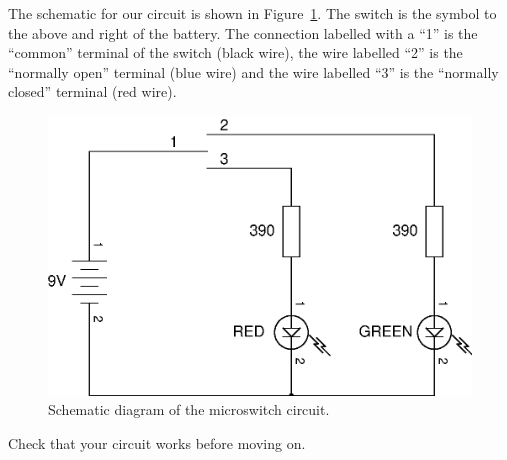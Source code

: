 \documentclass{article}
\begin{document}
The schematic for our circuit is shown in Figure~\ref{fig:schem:switch}. The
switch is the symbol to the above and right of the battery. The connection
labelled with a ``1'' is the ``common'' terminal of the switch (black wire), the
wire labelled ``2'' is the ``normally open'' terminal (blue wire) and the wire
labelled ``3'' is the ``normally closed'' terminal (red wire).

\begin{figure}
\centering
\includegraphics[width=\textwidth]{assets/fig/schem/switch}
\caption{Schematic diagram of the microswitch circuit.}
\label{fig:schem:switch}
\end{figure}

Check that your circuit works before moving on.
\end{document}
